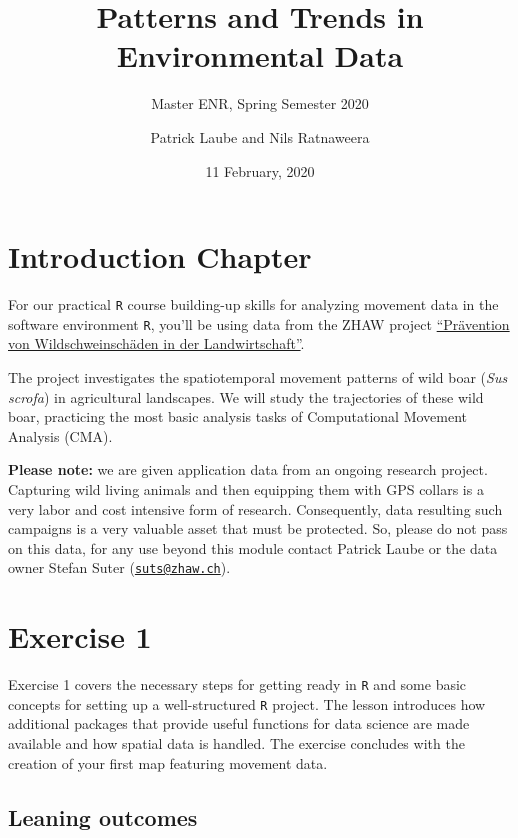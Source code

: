 \documentclass[]{book}
\title{Patterns and Trends in Environmental Data}
\subtitle{Master ENR, Spring Semester 2020}
\author{Patrick Laube and Nils Ratnaweera}
\date{11 February, 2020}
\begin{document}
\maketitle

{
\setcounter{tocdepth}{1}
\tableofcontents
}
\hypertarget{introduction-chapter}{%
\chapter*{Introduction Chapter}\label{introduction-chapter}}

For our practical \texttt{R} course building-up skills for analyzing movement data in the software environment \texttt{R}, you'll be using data from the ZHAW project \href{https://www.zhaw.ch/de/lsfm/institute-zentren/iunr/integrative-oekologie/wildtiermanagement/referenzprojekte/}{``Prävention von Wildschweinschäden in der Landwirtschaft''}.

The project investigates the spatiotemporal movement patterns of wild boar (\emph{Sus scrofa}) in agricultural landscapes. We will study the trajectories of these wild boar, practicing the most basic analysis tasks of Computational Movement Analysis (CMA).

\textbf{Please note:} we are given application data from an ongoing research project. Capturing wild living animals and then equipping them with GPS collars is a very labor and cost intensive form of research. Consequently, data resulting such campaigns is a very valuable asset that must be protected. So, please do not pass on this data, for any use beyond this module contact Patrick Laube or the data owner Stefan Suter (\href{mailto:suts@zhaw.ch}{\nolinkurl{suts@zhaw.ch}}).

\hypertarget{exercise-1}{%
\chapter{Exercise 1}\label{exercise-1}}

Exercise 1 covers the necessary steps for getting ready in \texttt{R} and some basic concepts for setting up a well-structured \texttt{R} project. The lesson introduces how additional packages that provide useful functions for data science are made available and how spatial data is handled. The exercise concludes with the creation of your first map featuring movement data.

\hypertarget{leaning-outcomes}{%
\section{Leaning outcomes}\label{leaning-outcomes}}
\end{document}
